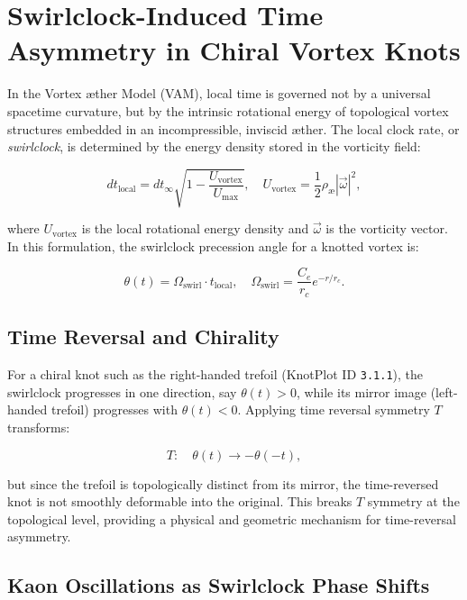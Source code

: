 
\section{Swirlclock-Induced Time Asymmetry in Chiral Vortex Knots}

In the Vortex \ae ther Model (VAM), local time is governed not by a universal spacetime curvature, but by the intrinsic rotational energy of topological vortex structures embedded in an incompressible, inviscid \ae ther. The local clock rate, or \emph{swirlclock}, is determined by the energy density stored in the vorticity field:

\begin{equation}
dt_{\text{local}} = dt_{\infty} \sqrt{1 - \frac{U_{\text{vortex}}}{U_{\text{max}}}}, \quad U_{\text{vortex}} = \frac{1}{2} \rho_\text{\ae} |\vec{\omega}|^2,
\end{equation}

where $U_{\text{vortex}}$ is the local rotational energy density and $\vec{\omega}$ is the vorticity vector. In this formulation, the swirlclock precession angle for a knotted vortex is:

\begin{equation}
\theta(t) = \Omega_{\text{swirl}} \cdot t_{\text{local}}, \quad \Omega_{\text{swirl}} = \frac{C_e}{r_c} e^{-r/r_c}.
\end{equation}

\subsection{Time Reversal and Chirality}

For a chiral knot such as the right-handed trefoil (KnotPlot ID \texttt{3.1.1}), the swirlclock progresses in one direction, say $\theta(t) > 0$, while its mirror image (left-handed trefoil) progresses with $\theta(t) < 0$. Applying time reversal symmetry $T$ transforms:

\begin{equation}
T: \quad \theta(t) \rightarrow -\theta(-t),
\end{equation}

but since the trefoil is topologically distinct from its mirror, the time-reversed knot is not smoothly deformable into the original. This breaks $T$ symmetry at the topological level, providing a physical and geometric mechanism for time-reversal asymmetry.

\subsection{Kaon Oscillations as Swirlclock Phase Shifts}

